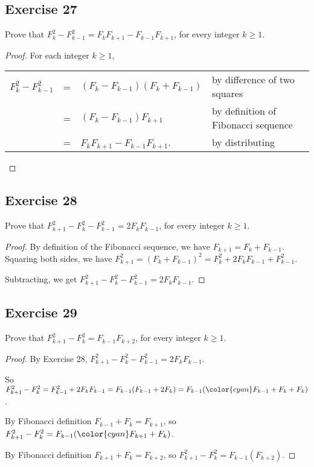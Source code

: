 \documentclass[14pt]{extarticle}
\newcommand{\cy}{\color{cyan}}
\begin{document}
\subsection{Exercise 27}
Prove that $F_k^2 - F_{k - 1}^2 = F_k F_{k + 1} - F_{k - 1}F_{k + 1}$, for every integer $k \geq 1$.

\begin{proof}
    For each integer $k \geq 1$,

    \begin{tabular}{rcll}
        $F_k^2 - F_{k-1}^2$ & = & $(F_k - F_{k-1})(F_k + F_{k-1})$ & {\cy by difference of two squares}        \\
                            & = & $(F_k - F_{k-1})F_{k+1}$         & {\cy by definition of Fibonacci sequence} \\
                            & = & $F_k F_{k+1} - F_{k-1} F_{k+1}$. & {\cy by distributing}
    \end{tabular}
\end{proof}

\subsection{Exercise 28}
Prove that $F_{k + 1}^2 - F_k^2 - F_{k - 1}^2 = 2F_kF_{k - 1}$, for every integer $k \geq 1$.

\begin{proof}
    By definition of the Fibonacci sequence, we have $F_{k+1} = F_k + F_{k-1}$. Squaring both sides, we have
    \(F_{k+1}^2 = (F_k + F_{k-1})^2 = F_k^2 + 2F_k F_{k-1} + F_{k-1}^2\).

    Subtracting, we get \(F_{k+1}^2 - F_k^2 - F_{k-1}^2 = 2F_k F_{k-1}\).
\end{proof}

\subsection{Exercise 29}
Prove that $F_{k + 1}^2 - F_k^2 = F_{k - 1}F_{k + 2}$, for every integer $k \geq 1$.

\begin{proof}
    By Exercise 28, $F_{k+1}^2 - F_k^2 - F_{k-1}^2 = 2F_k F_{k-1}$.

    So $F_{k+1}^2 - F_k^2 = F_{k-1}^2 + 2F_k F_{k-1} = F_{k-1}(F_{k-1} + 2F_k) = F_{k-1}({\cy F_{k-1} + F_k} + F_k)$.

    By Fibonacci definition $F_{k-1} + F_k = F_{k+1}$, so $F_{k+1}^2 - F_k^2 = F_{k-1}({\cy F_{k+1}} + F_k)$.

    By Fibonacci definition $F_{k+1} + F_k = F_{k+2}$, so $F_{k+1}^2 - F_k^2 = F_{k-1}(F_{k+2})$.
\end{proof}
\end{document}
